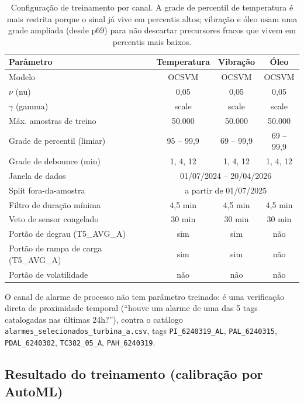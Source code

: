 \documentclass[11pt,a4paper]{article}
\begin{document}
\begin{table}[H]
\centering
\small
\begin{tabular}{lccc}
\toprule
\textbf{Parâmetro} & \textbf{Temperatura} & \textbf{Vibração} & \textbf{Óleo} \\
\midrule
Modelo & OCSVM & OCSVM & OCSVM \\
$\nu$ (nu) & 0,05 & 0,05 & 0,05 \\
$\gamma$ (gamma) & scale & scale & scale \\
Máx. amostras de treino & 50.000 & 50.000 & 50.000 \\
Grade de percentil (limiar) & 95 -- 99,9 & 69 -- 99,9 & 69 -- 99,9 \\
Grade de debounce (min) & 1, 4, 12 & 1, 4, 12 & 1, 4, 12 \\
Janela de dados & \multicolumn{3}{c}{01/07/2024 -- 20/04/2026} \\
Split fora-da-amostra & \multicolumn{3}{c}{a partir de 01/07/2025} \\
\midrule
Filtro de duração mínima & 4,5 min & 4,5 min & 4,5 min \\
Veto de sensor congelado & 30 min & 30 min & 30 min \\
Portão de degrau (T5\_AVG\_A) & sim & sim & não \\
Portão de rampa de carga (T5\_AVG\_A) & sim & sim & não \\
Portão de volatilidade & não & não & não \\
\bottomrule
\end{tabular}
\caption{Configuração de treinamento por canal. A grade de percentil
de temperatura é mais restrita porque o sinal já vive em percentis
altos; vibração e óleo usam uma grade ampliada (desde p69) para não
descartar precursores fracos que vivem em percentis mais baixos.}
\end{table}

O canal de alarme de processo não tem parâmetro treinado: é uma
verificação direta de proximidade temporal (``houve um alarme de uma
das 5 tags catalogadas nas últimas 24h?''), contra o catálogo
\texttt{alarmes\_selecionados\_turbina\_a.csv}, tags
\texttt{PI\_6240319\_AL}, \texttt{PAL\_6240315},
\texttt{PDAL\_6240302}, \texttt{TC382\_05\_A}, \texttt{PAH\_6240319}.

\subsection{Resultado do treinamento (calibração por AutoML)}
\end{document}
